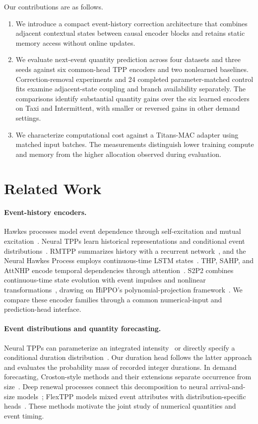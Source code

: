\documentclass[runningheads]{llncs}
\begin{document}
Our contributions are as follows.
\begin{enumerate}
\item We introduce a compact event-history correction architecture that
combines adjacent contextual states between causal encoder blocks and retains
static memory access without online updates.
\item We evaluate next-event quantity prediction across four datasets and
three seeds against six common-head TPP encoders and two nonlearned baselines.
Correction-removal experiments and 24 completed parameter-matched control
fits examine adjacent-state coupling and branch availability separately. The comparisons
identify substantial quantity gains over the six learned encoders on Taxi
and Intermittent, with smaller or reversed gains in other demand settings.
\item We characterize computational cost against a Titans-MAC adapter using
matched input batches. The measurements distinguish lower training compute
and memory from the higher allocation observed during evaluation.
\end{enumerate}

\section{Related Work}
\paragraph{Event-history encoders.}
Hawkes processes model event dependence through self-excitation and mutual
excitation~\cite{hawkes1971spectra}. Neural TPPs learn historical
representations and conditional event distributions~\cite{shchur2021review}.
RMTPP summarizes history with a recurrent network~\cite{du2016rmtpp}, and the
Neural Hawkes Process employs continuous-time LSTM states~\cite{mei2017nhp}.
THP, SAHP, and AttNHP encode temporal dependencies through
attention~\cite{zuo2020thp,zhang2020sahp,yang2022attnhp}.
S2P2 combines continuous-time state evolution with event impulses and
nonlinear transformations~\cite{chang2025s2p2}, drawing on HiPPO's
polynomial-projection framework~\cite{gu2020hippo}. We compare these encoder
families through a common numerical-input and prediction-head interface.

\paragraph{Event distributions and quantity forecasting.}
Neural TPPs can parameterize an integrated intensity~\cite{omi2019fully} or
directly specify a conditional duration distribution~\cite{shchur2020intensityfree}.
Our duration head follows the latter approach and evaluates the probability
mass of recorded integer durations. In demand forecasting, Croston-style
methods and their extensions separate occurrence from
size~\cite{croston1972forecasting,syntetos2005accuracy,teunter2011obsolescence}.
Deep renewal processes connect this decomposition to neural arrival-and-size
models~\cite{turkmen2021renewal}; FlexTPP models mixed event attributes with
distribution-specific heads~\cite{draxler2025flextpp}. These methods motivate
the joint study of numerical quantities and event timing.
\end{document}
